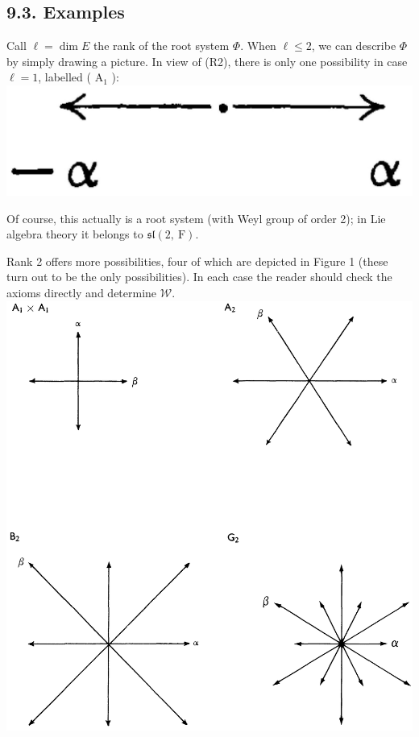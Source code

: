 \documentclass[10pt]{article}
\begin{document}
\subsection*{9.3. Examples}
Call $\ell=\operatorname{dim} E$ the rank of the root system $\Phi$. When $\ell \leq 2$, we can describe $\Phi$ by simply drawing a picture. In view of (R2), there is only one possibility in case $\ell=1$, labelled ( $\mathrm{A}_{1}$ ):\\
\includegraphics[max width=\textwidth, center]{2025_06_06_fac2836a92464059da43g-056}

Of course, this actually is a root system (with Weyl group of order 2); in Lie algebra theory it belongs to $\mathfrak{s l}(2, \mathrm{~F})$.

Rank 2 offers more possibilities, four of which are depicted in Figure 1 (these turn out to be the only possibilities). In each case the reader should check the axioms directly and determine $\mathscr{W}$.\\
\includegraphics[max width=\textwidth, center]{2025_06_06_fac2836a92464059da43g-057}
\end{document}
